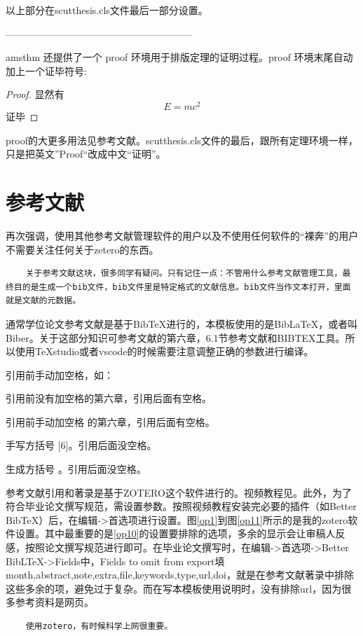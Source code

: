 以上部分在scutthesis.cls文件最后一部分设置。

---------------------------------------------------------

amsthm 还提供了一个 proof 环境用于排版定理的证明过程。proof 环境末尾自动加上一个证毕符号:
\begin{proof}
	显然有
	\[
	E=mc^2
	\]
	证毕
\end{proof}

proof的大更多用法见参考文献\cite{_g}。scutthesis.cls文件的最后，跟所有定理环境一样，只是把英文”Proof“改成中文“证明”。

\section{参考文献}

再次强调，使用其他参考文献管理软件的用户以及不使用任何软件的“裸奔”的用户不需要关注任何关于zetero的东西。
\begin{lstlisting}
	关于参考文献这块，很多同学有疑问。只有记住一点：不管用什么参考文献管理工具，最终目的是生成一个bib文件，bib文件里是特定格式的文献信息。bib文件当作文本打开，里面就是文献的元数据。
\end{lstlisting}

通常学位论文参考文献是基于BibTeX进行的，本模板使用的是BibLaTeX，或者叫Biber。关于这部分知识可参考文献\parencite{_c,_g}的第六章，6.1节参考文献和BIBTEX工具。所以使用TeXstudio或者vscode的时候需要注意调整正确的参数进行编译。

引用前手动加空格，如：

引用前没有加空格\parencite{_c,_g}的第六章，引用后面有空格。

引用前手动加空格 \parencite{_c,_g}的第六章，引用后面有空格。

手写方括号 [6]。引用后面没空格。

生成方括号 \parencite{_k}。引用后面没空格。


参考文献引用和著录是基于ZOTERO这个软件进行的。视频教程见\parencite{_k}。此外，为了符合毕业论文撰写规范，需设置参数。按照视频教程安装完必要的插件（如Better BibTeX）后，在编辑->首选项进行设置。图\ref{op1}到图\ref{op11}所示的是我的zotero软件设置。其中最重要的是\ref{op10}的设置要排除的选项，多余的显示会让审稿人反感，按照论文撰写规范进行即可。在毕业论文撰写时，在编辑->首选项->Better BibLTeX->Fields中，Fields to omit from export填month,abstract,note,extra,file,keywords,type,url,doi，就是在参考文献著录中排除这些多余的项，避免过于复杂。而在写本模板使用说明时，没有排除url，因为很多参考资料是网页。

\begin{lstlisting}
    使用zotero，有时候科学上网很重要。
\end{lstlisting}

